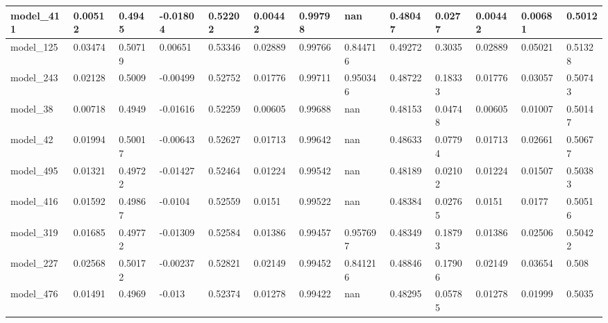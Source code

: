\begin{tabular}{|l|l|l|l|l|l|l|l|l|l|l|l|l|}
model\_411     & 0.00512     & 0.4945         & -0.01804     & 0.52202          & 0.00442              & 0.99798              & nan          & 0.48047           & 0.0277             & 0.00442         & 0.00681     & 0.5012       \\ \hline
model\_125     & 0.03474     & 0.50719        & 0.00651      & 0.53346          & 0.02889              & 0.99766              & 0.844716     & 0.49272           & 0.3035             & 0.02889         & 0.05021     & 0.51328      \\ \hline
model\_243     & 0.02128     & 0.5009         & -0.00499     & 0.52752          & 0.01776              & 0.99711              & 0.950346     & 0.48722           & 0.18333            & 0.01776         & 0.03057     & 0.50743      \\ \hline
model\_38      & 0.00718     & 0.4949         & -0.01616     & 0.52259          & 0.00605              & 0.99688              & nan          & 0.48153           & 0.04748            & 0.00605         & 0.01007     & 0.50147      \\ \hline
model\_42      & 0.01994     & 0.50017        & -0.00643     & 0.52627          & 0.01713              & 0.99642              & nan          & 0.48633           & 0.07794            & 0.01713         & 0.02661     & 0.50677      \\ \hline
model\_495     & 0.01321     & 0.49722        & -0.01427     & 0.52464          & 0.01224              & 0.99542              & nan          & 0.48189           & 0.02102            & 0.01224         & 0.01507     & 0.50383      \\ \hline
model\_416     & 0.01592     & 0.49867        & -0.0104      & 0.52559          & 0.0151               & 0.99522              & nan          & 0.48384           & 0.02765            & 0.0151          & 0.0177      & 0.50516      \\ \hline
model\_319     & 0.01685     & 0.49772        & -0.01309     & 0.52584          & 0.01386              & 0.99457              & 0.957697     & 0.48349           & 0.18793            & 0.01386         & 0.02506     & 0.50422      \\ \hline
model\_227     & 0.02568     & 0.50172        & -0.00237     & 0.52821          & 0.02149              & 0.99452              & 0.841216     & 0.48846           & 0.17906            & 0.02149         & 0.03654     & 0.508        \\ \hline
model\_476     & 0.01491     & 0.4969         & -0.013       & 0.52374          & 0.01278              & 0.99422              & nan          & 0.48295           & 0.05785            & 0.01278         & 0.01999     & 0.5035       \\ \hline

\end{tabular}
